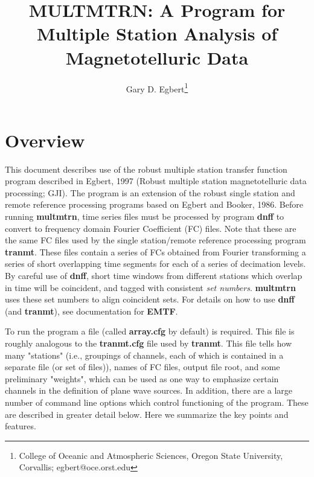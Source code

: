 \setlength{\textheight}{23cm}
\setlength{\textwidth}{16cm}
\setlength{\oddsidemargin}{0.25in}
\setlength{\topmargin}{-0.5in}
\title{MULTMTRN: A Program for Multiple Station Analysis of Magnetotelluric Data}
\author{Gary D. Egbert\thanks{College of Oceanic and Atmospheric Sciences, Oregon State University, Corvallis; egbert@oce.orst.edu}}



\maketitle

\section{Overview}

This document describes use of the robust multiple station
transfer function program described in Egbert, 1997 (Robust multiple station
magnetotelluric data processing; GJI).  The program is an extension of
the robust single station and remote reference processing programs
based on Egbert and Booker, 1986.  Before running {\bf multmtrn}, time series files
must be processed by program {\bf dnff} to convert to frequency domain
Fourier Coefficient (FC) files. Note that these are the same FC
files used by the single station/remote reference processing program {\bf tranmt}.
These files contain a series of FCs obtained from Fourier transforming a
series of short overlapping time segments for each of a series of decimation
levels.  By careful use of {\bf dnff}, 
short time windows from different stations which overlap in time will be coincident,
and tagged with consistent {\it set numbers}.  {\bf multmtrn} uses these
set numbers to align coincident sets.  For details on how to use {\bf dnff}
(and {\bf tranmt}), see documentation for {\bf EMTF}.

To run the program a file (called {\bf array.cfg} by default) is required.
This file is roughly analogous to the {\bf tranmt.cfg} file used by
{\bf tranmt}.   This file tells
how many "stations" (i.e., groupings of channels, each of which is contained
in a separate file (or set of files)), names of FC files, output file root,
and some preliminary "weights", which can be used as one way to emphasize 
certain channels in the definition of plane wave sources.  In addition, there
are a large number of command line options which control functioning of the
program.  These are described in greater detail below.  Here we summarize the
key points and features.  

